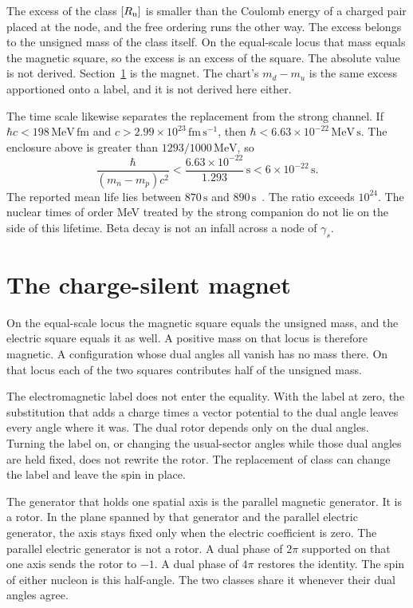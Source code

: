 \documentclass[a4paper]{article}
\begin{document}
The excess of the class \([R_{\rm n}]\) is smaller than the Coulomb energy of a charged pair placed at the node, and the free ordering runs the other way. The excess belongs to the unsigned mass of the class itself. On the equal-scale locus that mass equals the magnetic square, so the excess is an excess of the square. The absolute value is not derived. Section~\ref{sec:moment} is the magnet. The chart's \(m_d-m_u\) is the same excess apportioned onto a label, and it is not derived here either.

The time scale likewise separates the replacement from the strong channel. If \(\hbar c<198\,\mathrm{MeV\,fm}\) and \(c>2.99\times 10^{23}\,\mathrm{fm\,s^{-1}}\), then \(\hbar<6.63\times 10^{-22}\,\mathrm{MeV\,s}\). The enclosure above is greater than \(1293/1000\,\mathrm{MeV}\), so
\[
\frac{\hbar}{(m_n-m_p)c^{2}}<\frac{6.63\times 10^{-22}}{1.293}\,\mathrm{s}<6\times 10^{-22}\,\mathrm{s}.
\]
The reported mean life lies between \(870\,\mathrm{s}\) and \(890\,\mathrm{s}\)~\cite{pdg2024}. The ratio exceeds \(10^{24}\). The nuclear times of order MeV treated by the strong companion do not lie on the side of this lifetime. Beta decay is not an infall across a node of \(\gamma_s\).

\section{The charge-silent magnet}
\label{sec:moment}

On the equal-scale locus the magnetic square equals the unsigned mass, and the electric square equals it as well. A positive mass on that locus is therefore magnetic. A configuration whose dual angles all vanish has no mass there. On that locus each of the two squares contributes half of the unsigned mass.

The electromagnetic label does not enter the equality. With the label at zero, the substitution that adds a charge times a vector potential to the dual angle leaves every angle where it was. The dual rotor depends only on the dual angles. Turning the label on, or changing the usual-sector angles while those dual angles are held fixed, does not rewrite the rotor. The replacement of class can change the label and leave the spin in place.

The generator that holds one spatial axis is the parallel magnetic generator. It is a rotor. In the plane spanned by that generator and the parallel electric generator, the axis stays fixed only when the electric coefficient is zero. The parallel electric generator is not a rotor. A dual phase of \(2\pi\) supported on that one axis sends the rotor to \(-1\). A dual phase of \(4\pi\) restores the identity. The spin of either nucleon is this half-angle. The two classes share it whenever their dual angles agree.
\end{document}
